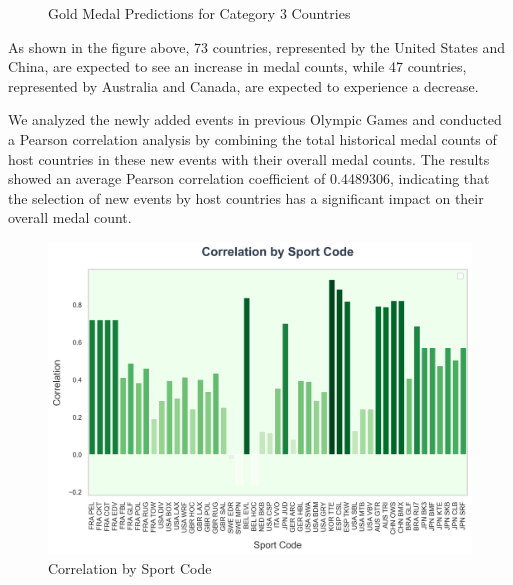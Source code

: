 \documentclass{mcmthesis}
\begin{document}
\begin{figure}[H]
	\centering
	\caption{Gold Medal Predictions for Category 3 Countries}
	\label{fig_E1}
\end{figure}

As shown in the figure above, 73 countries, represented by the United States and China, are expected to see an increase in medal counts, while 47 countries, represented by Australia and Canada, are expected to experience a decrease.

We analyzed the newly added events in previous Olympic Games and conducted a Pearson correlation analysis by combining the total historical medal counts of host countries in these new events with their overall medal counts. The results showed an average Pearson correlation coefficient of 0.4489306, indicating that the selection of new events by host countries has a significant impact on their overall medal count.

\begin{figure}[H]
    \centering
    \includegraphics[width=12cm]{graph/Correlation by Sport Code.png}
    \caption{Correlation by Sport Code} \label{Figure 4}
\end{figure}
\end{document}
